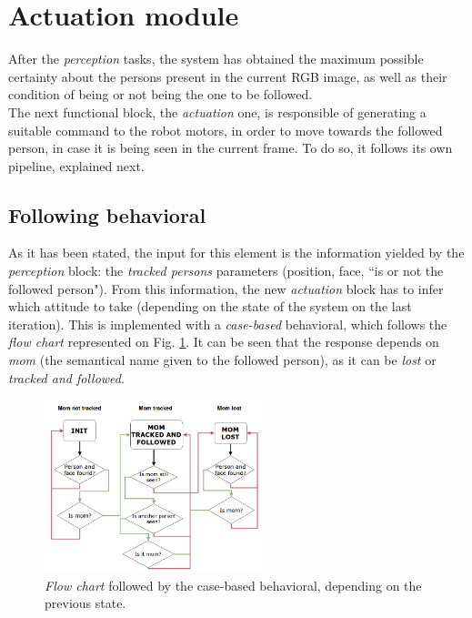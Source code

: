 \section{Actuation module}

After the \emph{perception} tasks, the system has obtained the maximum possible certainty about the persons present in the current RGB image, as well as their condition of being or not being the one to be followed.\\

The next functional block, the \emph{actuation} one, is responsible of generating a suitable command to the robot motors, in order to move towards the followed person, in case it is being seen in the current frame. To do so, it follows its own pipeline, explained next.


\subsection{Following behavioral}

As it has been stated, the input for this element is the information yielded by the \emph{perception} block: the \emph{tracked persons} parameters (position, face, ``is or not the followed person"). From this information, the new \emph{actuation} block has to infer which attitude to take (depending on the state of the system on the last iteration). This is implemented with a \emph{case-based} behavioral, which follows the \emph{flow chart} represented on Fig. \ref{fig:actuation_flow}. It can be seen that the response depends on \emph{mom} (the semantical name given to the followed person), as it can be \emph{lost} or \emph{tracked and followed}.\\

\begin{figure}[h]
	\centering
	\includegraphics[width=2.5in]{images/flowchart}
	\caption{\emph{Flow chart} followed by the case-based behavioral, depending on the previous state.}
	\label{fig:actuation_flow}
\end{figure}


